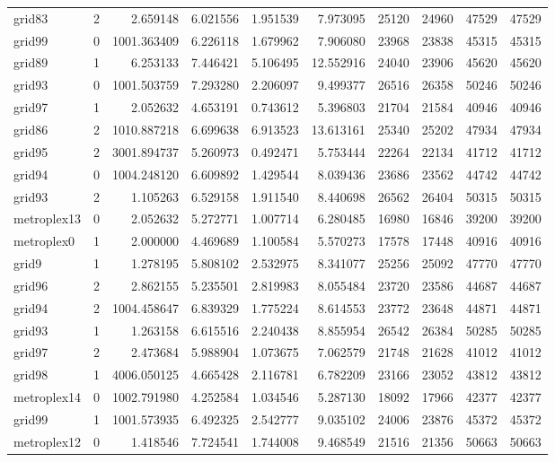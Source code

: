 \begin{longtable}{|l|r|r|r|r|r|r|r|r|r|}
grid83 & 2 & 2.659148 & 6.021556 & 1.951539 & 7.973095 & 25120 & 24960 & 47529 & 47529 \\
grid99 & 0 & 1001.363409 & 6.226118 & 1.679962 & 7.906080 & 23968 & 23838 & 45315 & 45315 \\
grid89 & 1 & 6.253133 & 7.446421 & 5.106495 & 12.552916 & 24040 & 23906 & 45620 & 45620 \\
grid93 & 0 & 1001.503759 & 7.293280 & 2.206097 & 9.499377 & 26516 & 26358 & 50246 & 50246 \\
grid97 & 1 & 2.052632 & 4.653191 & 0.743612 & 5.396803 & 21704 & 21584 & 40946 & 40946 \\
grid86 & 2 & 1010.887218 & 6.699638 & 6.913523 & 13.613161 & 25340 & 25202 & 47934 & 47934 \\
grid95 & 2 & 3001.894737 & 5.260973 & 0.492471 & 5.753444 & 22264 & 22134 & 41712 & 41712 \\
grid94 & 0 & 1004.248120 & 6.609892 & 1.429544 & 8.039436 & 23686 & 23562 & 44742 & 44742 \\
grid93 & 2 & 1.105263 & 6.529158 & 1.911540 & 8.440698 & 26562 & 26404 & 50315 & 50315 \\
metroplex13 & 0 & 2.052632 & 5.272771 & 1.007714 & 6.280485 & 16980 & 16846 & 39200 & 39200 \\
metroplex0 & 1 & 2.000000 & 4.469689 & 1.100584 & 5.570273 & 17578 & 17448 & 40916 & 40916 \\
grid9 & 1 & 1.278195 & 5.808102 & 2.532975 & 8.341077 & 25256 & 25092 & 47770 & 47770 \\
grid96 & 2 & 2.862155 & 5.235501 & 2.819983 & 8.055484 & 23720 & 23586 & 44687 & 44687 \\
grid94 & 2 & 1004.458647 & 6.839329 & 1.775224 & 8.614553 & 23772 & 23648 & 44871 & 44871 \\
grid93 & 1 & 1.263158 & 6.615516 & 2.240438 & 8.855954 & 26542 & 26384 & 50285 & 50285 \\
grid97 & 2 & 2.473684 & 5.988904 & 1.073675 & 7.062579 & 21748 & 21628 & 41012 & 41012 \\
grid98 & 1 & 4006.050125 & 4.665428 & 2.116781 & 6.782209 & 23166 & 23052 & 43812 & 43812 \\
metroplex14 & 0 & 1002.791980 & 4.252584 & 1.034546 & 5.287130 & 18092 & 17966 & 42377 & 42377 \\
grid99 & 1 & 1001.573935 & 6.492325 & 2.542777 & 9.035102 & 24006 & 23876 & 45372 & 45372 \\
metroplex12 & 0 & 1.418546 & 7.724541 & 1.744008 & 9.468549 & 21516 & 21356 & 50663 & 50663 \\

\end{longtable}
